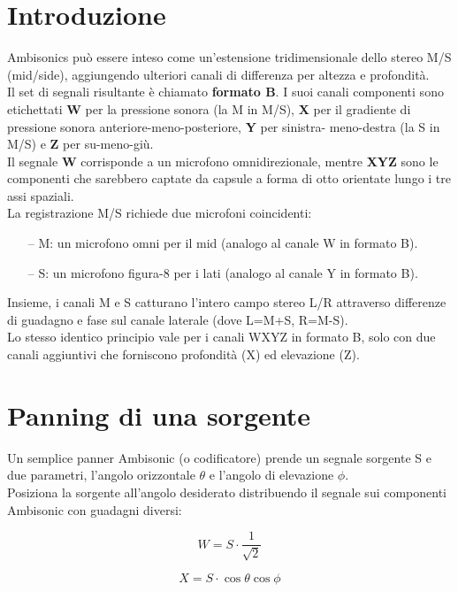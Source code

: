   \section{Introduzione}
Ambisonics può essere inteso come un'estensione tridimensionale dello stereo M/S (mid/side),
aggiungendo ulteriori canali di differenza per altezza e profondità.\\
Il set di segnali risultante è chiamato \textbf{formato B}.
I suoi canali componenti sono etichettati \textbf{W} per la pressione sonora (la M in M/S),
\textbf{X} per il gradiente di pressione sonora anteriore-meno-posteriore, 
\textbf{Y} per sinistra- meno-destra (la S in M/S) e \textbf{Z} per su-meno-giù. \\
Il segnale \textbf{W} corrisponde a un microfono omnidirezionale,
mentre \textbf{XYZ} sono le componenti che sarebbero captate da
capsule a forma di otto orientate lungo i tre assi spaziali.\\
La registrazione M/S richiede due microfoni coincidenti:

\begin{itemize}
      \item[--] M: un microfono omni per il mid (analogo al canale W in formato B).
      \item[--] S: un microfono figura-8 per i lati (analogo al canale Y in formato B).
    \end{itemize}

Insieme, i canali M e S catturano l'intero campo stereo L/R attraverso differenze di guadagno
 e fase sul canale laterale (dove L=M+S, R=M-S).\\
Lo stesso identico principio vale per i canali WXYZ in formato B,
 solo con due canali aggiuntivi che forniscono profondità (X) ed elevazione (Z).

\section{Panning di una sorgente}
Un semplice panner Ambisonic (o codificatore) prende un segnale sorgente S e due parametri,
 l'angolo orizzontale $\theta$ e l'angolo di elevazione $\phi$.\\
 Posiziona la sorgente all'angolo desiderato distribuendo il segnale sui 
 componenti Ambisonic con guadagni diversi:

 \begin{equation}
W =S\cdot\frac{1}{\sqrt{2}}
 \end{equation}

 \begin{equation}
      X=S\cdot\cos\theta\cos\phi
\end{equation}

